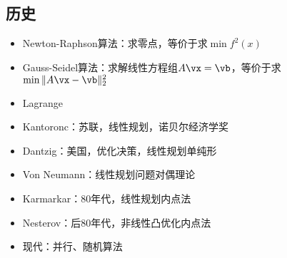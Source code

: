 \subsection{历史}
\begin{itemize}
\item Newton-Raphson算法：求零点，等价于求$\min f^2(x)$
\item Gauss-Seidel算法：求解线性方程组$A\vx=\vb$，等价于求$\min \|A\vx-\vb\|_2^2$
\item Lagrange
\item Kantoronc：苏联，线性规划，诺贝尔经济学奖
\item Dantzig：美国，优化决策，线性规划单纯形
\item Von Neumann：线性规划问题对偶理论
\item Karmarkar：80年代，线性规划内点法
\item Nesterov：后80年代，非线性凸优化内点法
\item 现代：并行、随机算法
\end{itemize}